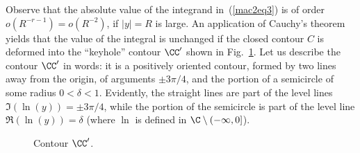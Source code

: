 Observe that the absolute value of the integrand in~(\ref{mac2eq3}) is of order $o(R^{-r-1}) = o(R^{-2})$, if $|y| = R$ is large. An application of Cauchy's theorem yields that the value of the integral is unchanged if the closed contour $C$ is deformed into the ``keyhole'' contour $\CC'$ shown in Fig.~\ref{fig:Cprime}.
Let us describe the contour $\CC'$ in words: it is a positively oriented contour, formed by two lines away from the origin, of arguments $\pm 3\pi/4$, and the portion of a semicircle of some radius $0 < \delta < 1$. Evidently, the straight lines are part of the level lines $\Im(\ln(y)) = \pm 3\pi/4$, while the portion of the semicircle is part of the level line $\Re(\ln(y)) = \delta$ (where $\ln$ is def\/ined in $\C \setminus (-\infty, 0]$).

\begin{figure}[t]\centering
{}
\caption{Contour $\CC'$.}\label{fig:Cprime}
\end{figure}

